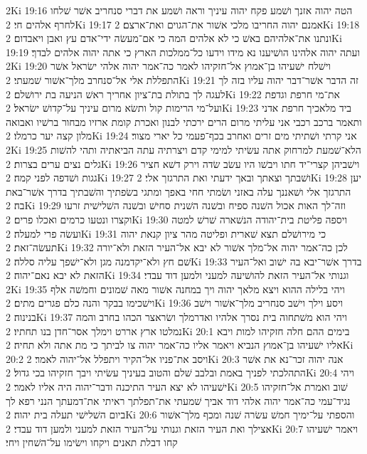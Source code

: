 2Ki 19:16  הטה יהוה אזנך ושׁמע פקח יהוה עיניך וראה ושׁמע את דברי סנחריב אשׁר שׁלחו לחרף אלהים חי׃
2Ki 19:17  אמנם יהוה החריבו מלכי אשׁור את־הגוים ואת־ארצם׃
2Ki 19:18  ונתנו את־אלהיהם באשׁ כי לא אלהים המה כי אם־מעשׂה ידי־אדם עץ ואבן ויאבדום׃
2Ki 19:19  ועתה יהוה אלהינו הושׁיענו נא מידו וידעו כל־ממלכות הארץ כי אתה יהוה אלהים לבדך׃
2Ki 19:20  וישׁלח ישׁעיהו בן־אמוץ אל־חזקיהו לאמר כה־אמר יהוה אלהי ישׂראל אשׁר התפללת אלי אל־סנחרב מלך־אשׁור שׁמעתי׃
2Ki 19:21  זה הדבר אשׁר־דבר יהוה עליו בזה לך לעגה לך בתולת בת־ציון אחריך ראשׁ הניעה בת ירושׁלם׃
2Ki 19:22  את־מי חרפת וגדפת ועל־מי הרימות קול ותשׂא מרום עיניך על־קדושׁ ישׂראל׃
2Ki 19:23  ביד מלאכיך חרפת אדני ותאמר ברכב רכבי אני עליתי מרום הרים ירכתי לבנון ואכרת קומת ארזיו מבחור ברשׁיו ואבואה מלון קצה יער כרמלו׃
2Ki 19:24  אני קרתי ושׁתיתי מים זרים ואחרב בכף־פעמי כל יארי מצור׃
2Ki 19:25  הלא־שׁמעת למרחוק אתה עשׂיתי למימי קדם ויצרתיה עתה הביאתיה ותהי להשׁות גלים נצים ערים בצרות׃
2Ki 19:26  וישׁביהן קצרי־יד חתו ויבשׁו היו עשׂב שׂדה וירק דשׁא חציר גגות ושׁדפה לפני קמה׃
2Ki 19:27  ושׁבתך וצאתך ובאך ידעתי ואת התרגזך אלי׃
2Ki 19:28  יען התרגזך אלי ושׁאננך עלה באזני ושׂמתי חחי באפך ומתגי בשׂפתיך והשׁבתיך בדרך אשׁר־באת בה׃
2Ki 19:29  וזה־לך האות אכול השׁנה ספיח ובשׁנה השׁנית סחישׁ ובשׁנה השׁלישׁית זרעו וקצרו ונטעו כרמים ואכלו פרים׃
2Ki 19:30  ויספה פליטת בית־יהודה הנשׁארה שׁרשׁ למטה ועשׂה פרי למעלה׃
2Ki 19:31  כי מירושׁלם תצא שׁארית ופליטה מהר ציון קנאת יהוה תעשׂה־זאת׃
2Ki 19:32  לכן כה־אמר יהוה אל־מלך אשׁור לא יבא אל־העיר הזאת ולא־יורה שׁם חץ ולא־יקדמנה מגן ולא־ישׁפך עליה סללה׃
2Ki 19:33  בדרך אשׁר־יבא בה ישׁוב ואל־העיר הזאת לא יבא נאם־יהוה׃
2Ki 19:34  וגנותי אל־העיר הזאת להושׁיעה למעני ולמען דוד עבדי׃
2Ki 19:35  ויהי בלילה ההוא ויצא מלאך יהוה ויך במחנה אשׁור מאה שׁמונים וחמשׁה אלף וישׁכימו בבקר והנה כלם פגרים מתים׃
2Ki 19:36  ויסע וילך וישׁב סנחריב מלך־אשׁור וישׁב בנינוה׃
2Ki 19:37  ויהי הוא משׁתחוה בית נסרך אלהיו ואדרמלך ושׂראצר הכהו בחרב והמה נמלטו ארץ אררט וימלך אסר־חדן בנו תחתיו׃
2Ki 20:1  בימים ההם חלה חזקיהו למות ויבא אליו ישׁעיהו בן־אמוץ הנביא ויאמר אליו כה־אמר יהוה צו לביתך כי מת אתה ולא תחיה׃
2Ki 20:2  ויסב את־פניו אל־הקיר ויתפלל אל־יהוה לאמר׃
2Ki 20:3  אנה יהוה זכר־נא את אשׁר התהלכתי לפניך באמת ובלבב שׁלם והטוב בעיניך עשׂיתי ויבך חזקיהו בכי גדול׃
2Ki 20:4  ויהי ישׁעיהו לא יצא העיר התיכנה ודבר־יהוה היה אליו לאמר׃
2Ki 20:5  שׁוב ואמרת אל־חזקיהו נגיד־עמי כה־אמר יהוה אלהי דוד אביך שׁמעתי את־תפלתך ראיתי את־דמעתך הנני רפא לך ביום השׁלישׁי תעלה בית יהוה׃
2Ki 20:6  והספתי על־ימיך חמשׁ עשׂרה שׁנה ומכף מלך־אשׁור אצילך ואת העיר הזאת וגנותי על־העיר הזאת למעני ולמען דוד עבדי׃
2Ki 20:7  ויאמר ישׁעיהו קחו דבלת תאנים ויקחו וישׂימו על־השׁחין ויחי׃

